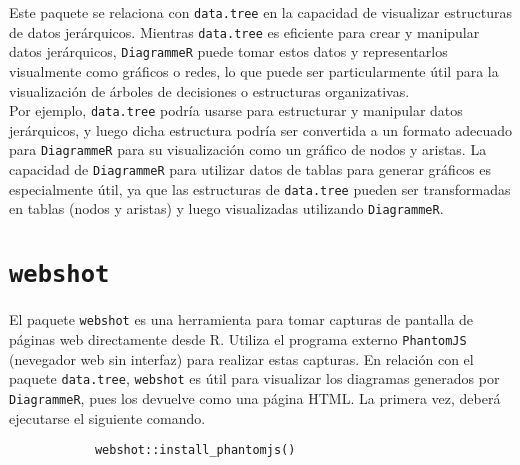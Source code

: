 \documentclass[12pt]{report}\usepackage[]{graphicx}\usepackage[dvipsnames]{xcolor}
\begin{document}
		 	Este paquete se relaciona con \texttt{data.tree} en la capacidad de visualizar estructuras de datos jerárquicos. Mientras \texttt{data.tree} es eficiente para crear y manipular datos jerárquicos, \texttt{DiagrammeR} puede tomar estos datos y representarlos visualmente como gráficos o redes, lo que puede ser particularmente útil para la visualización de árboles de decisiones o estructuras organizativas.\\
		 	
		 	Por ejemplo, \texttt{data.tree} podría usarse para estructurar y manipular datos jerárquicos, y luego dicha estructura podría ser convertida a un formato adecuado para \texttt{DiagrammeR} para su visualización como un gráfico de nodos y aristas. La capacidad de \texttt{DiagrammeR} para utilizar datos de tablas para generar gráficos es especialmente útil, ya que las estructuras de \texttt{data.tree} pueden ser transformadas en tablas (nodos y aristas) y luego visualizadas utilizando \texttt{DiagrammeR}.
		 	
	 \section{\texttt{webshot}}
	 
	 	El paquete \texttt{webshot} es una herramienta para tomar capturas de pantalla de páginas web directamente desde R. Utiliza el programa externo \texttt{PhantomJS} (nevegador web sin interfaz) para realizar estas capturas. En relación con el paquete \texttt{data.tree}, \texttt{webshot} es útil para visualizar los diagramas generados por \texttt{DiagrammeR}, pues los devuelve como una página HTML. La primera vez, deberá ejecutarse el siguiente comando. 
	 	
	 	\begin{verbatim}
	 		webshot::install_phantomjs()
	 	\end{verbatim}
	 		
\end{document}
